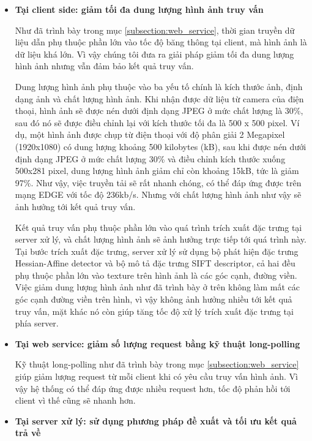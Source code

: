 \begin{itemize}
\item \textbf{Tại client side: giảm tối đa dung lượng hình ảnh truy vấn}

Như đã trình bày trong mục \ref{subsection:web_service}, thời gian truyền dữ liệu dẫn phụ thuộc phần lớn vào tốc độ băng thông tại client, mà hình ảnh là dữ liệu khá lớn. Vì vậy chúng tôi đưa ra giải pháp giảm tối đa dung lượng hình ảnh nhưng vẫn đảm bảo kết quả truy vấn.

Dung lượng hình ảnh phụ thuộc vào ba yếu tố chính là kích thước ảnh, định dạng ảnh và chất lượng hình ảnh. Khi nhận được dữ liệu từ camera của điện thoại, hình ảnh sẽ được nén dưới định dạng JPEG ở mức chất lượng là 30\%, sau đó nó sẽ được điều chỉnh lại với kích thước tối đa là 500 x 500 pixel. Ví dụ, một hình ảnh được chụp từ điện thoại với độ phân giải 2 Megapixel (1920x1080) có dung lượng khoảng 500 kilobytes (kB), sau khi được nén dưới định dạng JPEG ở mức chất lượng 30\% và điều chỉnh kích thước xuống 500x281 pixel, dung lượng hình ảnh giảm chỉ còn khoảng 15kB, tức là giảm 97\%. Như vậy, việc truyền tải sẽ rất nhanh chóng, có thể đáp ứng được trên mạng EDGE với tốc độ 236kb/s. Nhưng với chất lượng hình ảnh như vậy sẽ ảnh hưởng tới kết quả truy vấn.

Kết quả truy vấn phụ thuộc phần lớn vào quá trình trích xuất đặc trưng tại server xử lý, và chất lượng hình ảnh sẽ ảnh hưởng trực tiếp tới quá trình này. Tại bước trích xuất đặc trưng, server xử lý sử dụng bộ phát hiện đặc trưng Hessian-Affine\cite{mikolajczyk2005comparison} detector và bộ mô tả đặc trưng SIFT descriptor\cite{lowe2004distinctive}, cả hai đều phụ thuộc phần lớn vào texture trên hình ảnh là các góc cạnh, đường viền. Việc giảm dung lượng hình ảnh như đã trình bày ở trên không làm mất các góc cạnh đường viền trên hình, vì vậy không ảnh hưởng nhiều tới kết quả truy vấn, mặt khác nó còn giúp tăng tốc độ xử lý trích xuất đặc trưng tại phía server.

\item \textbf{Tại web service: giảm số lượng request bằng kỹ thuật long-polling}

Kỹ thuật long-polling như đã trình bày trong mục \ref{subsection:web_service} giúp giảm lượng request từ mỗi client khi có yêu cầu truy vấn hình ảnh. Vì vậy hệ thống có thể đáp ứng được nhiều request hơn, tốc độ phản hồi tới client vì thế cũng sẽ nhanh hơn.

\item \textbf{Tại server xử lý: sử dụng phương pháp đề xuất và tối ưu kết quả trả về}


\end{itemize}
